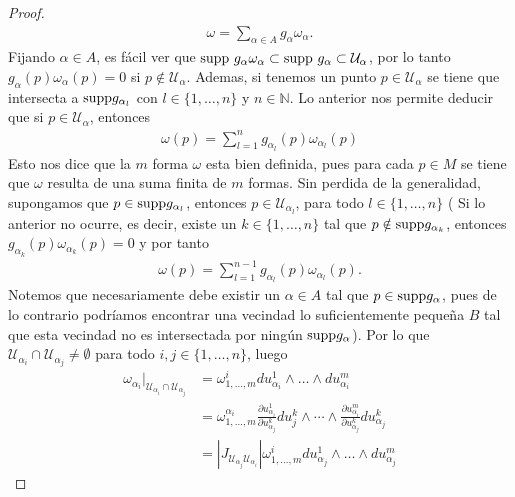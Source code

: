 \documentclass[10pt,a4paper]{report}
\begin{document}
\begin{proof}
       \begin{align*}
       	\omega = \sum_{\alpha\in A} g_{\alpha} \omega_{\alpha}.
       \end{align*}
       Fijando $\alpha\in A$, es fácil ver que $\textup{supp}\ g_{\alpha}\omega_{\alpha}\subset\textup{supp}\ g_{\alpha}\subset \mathcal{U}_{\alpha}$, por lo tanto $g_{\alpha}(p)\omega_{\alpha}(p)=0$ si $p\notin \mathcal{U}_{\alpha}$. Ademas, si tenemos un punto $p\in \mathcal{U}_{\alpha}$ se tiene que intersecta a $\textup{supp}g_{\alpha_{l}}$ con $l\in \{1,\dots,n\}$ y $n\in \mathbb{N}$. Lo anterior nos permite deducir que si $p\in \mathcal{U}_{\alpha}$, entonces
       \begin{align*}
       	\omega(p) = \sum_{l=1}^{n}g_{\alpha_{l}}(p)\omega_{\alpha_{l}}(p)
       \end{align*}
       Esto nos dice que la $m$ forma $\omega$ esta bien definida, pues para cada $p\in M$ se tiene que $\omega$ resulta de una suma finita de $m$ formas. Sin perdida de la generalidad, supongamos que $p\in \textup{supp}g_{\alpha_{l}}$, entonces $p\in \mathcal{U}_{\alpha_{l}}$, para todo $l\in \{1,\dots,n\}$ ( Si lo anterior no ocurre, es decir, existe un $k\in \{1,\dots,n\}$ tal que $p\notin \textup{supp}g_{\alpha_{k}}$, entonces $g_{\alpha_{k}}(p)\omega_{\alpha_{k}}(p) = 0$ y por tanto
       \begin{align*}
       	\omega(p) = \sum_{l=1}^{n-1}g_{\alpha_{l}}(p)\omega_{\alpha_{l}}(p).
       \end{align*}
       Notemos que necesariamente debe existir un $\alpha\in A$ tal que $p\in \textup{supp}g_{\alpha}$, pues de lo contrario podríamos encontrar una vecindad lo suficientemente pequeña $B$ tal que esta vecindad no es intersectada por ningún $\textup{supp}g_{\alpha}$). 
       Por lo que $\mathcal{U}_{\alpha_{i}}\cap\mathcal{U}_{\alpha_{j}}\neq\emptyset$ para todo $i,j\in\{1,\dots,n\}$, luego
       \begin{align*}
       	\omega_{\alpha_{i}}\big|_{\mathcal{U}_{\alpha_i}\cap\mathcal{U}_{\alpha_j}} &= \omega_{1,\dots,m}^{i}du^{1}_{\alpha_{i}}\wedge \dots\wedge du^{m}_{\alpha_{i}}\\
       	&= \omega_{1,\dots,m}^{\alpha_{i}} \frac{\partial u^{1}_{\alpha_{i}}}{\partial u^{k}_{\alpha_{j}}}du^{k}_{j}\wedge\cdots\wedge\frac{\partial u^{m}_{\alpha_{i}}}{\partial u^{k}_{\alpha_{j}}}du^{k}_{\alpha_{j}}\\
       	&=\left| J_{\mathcal{U}_{\alpha_{j}}\mathcal{U}_{\alpha_{i}}} \right|  \omega_{1,\dots,m}^{i}du^{1}_{\alpha_{j}}\wedge \dots\wedge du^{m}_{\alpha_{j}}

\end{align*}
\end{proof}
\end{document}
